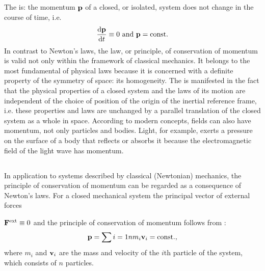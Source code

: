 \subsection{}\label{2.7.1} The  is: the momentum $\vb{p}$ of a closed, or isolated, system does not change in the course of time, i.e.
\begin{equation*}%
\dv{\vb{p}}{t} \equiv 0\,\,\textrm{and}\,\,\vb{p}= \textrm{const.}
\end{equation*}
In contrast to Newton's laws, the law, or principle, of conser­vation of momentum is valid not only within the framework of classical mechanics. It belongs to the most fundamental of physical laws because it is concerned with a definite property of the symmetry of space: its homogeneity. The  is manifested in the fact that the physical properties of a closed system and the laws of its motion are independent of the choice of position of the origin of the inertial reference frame, i.e. these properties and laws are unchanged by a parallel translation of the closed system as a whole in space. According to modern concepts, fields can also have momentum, not only particles and bodies. Light, for example, exerts a pressure on the surface of a body that reflects or absorbs it because the electromagnetic field of the light wave has momentum.

\subsection{}\label{2.7.2} In application to systems described by classical (Newto­nian) mechanics, the principle of conservation of momentum can be regarded as a consequence of Newton's laws. For a closed mechanical system the principal vector of external forces
 
$\vb{F}^{\textrm{ext}}\equiv 0$ and the principle of conservation of momentum follows from :
\begin{equation*}%
\vb{p} = \sum{i=1}{n} m_{i} \vb{v}_{i} = \textrm{const.},
\end{equation*}
where $m_{i}$ and $\vb{v}_{i}$ are the mass and velocity of the $i$th particle of the system, which consists of $n$ particles.

